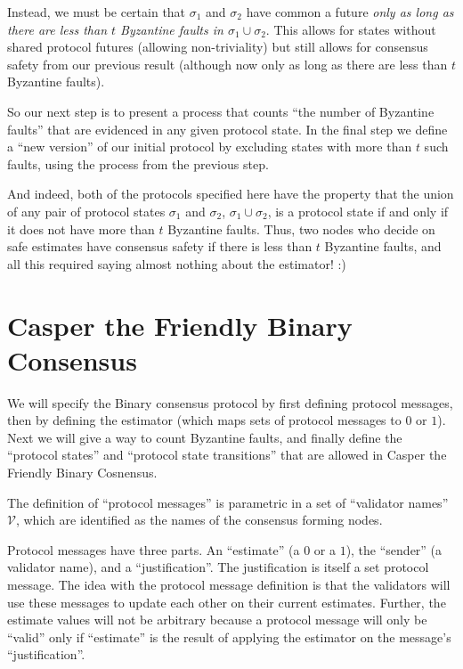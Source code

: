 \documentclass{article}
\theoremstyle{definition}
\begin{document}
Instead, we must be certain that $\sigma_1$ and $\sigma_2$ have common a future \emph{only as long as there are less than $t$ Byzantine faults in $\sigma_1 \cup \sigma_2$}. This allows for states without shared protocol futures (allowing non-triviality) but still allows for consensus safety from our previous result (although now only as long as there are less than $t$ Byzantine faults).

So our next step is to present a process that counts ``the number of Byzantine faults'' that are evidenced in any given protocol state. In the final step we define a ``new version'' of our initial protocol by excluding states with more than $t$ such faults, using the process from the previous step.

And indeed, both of the protocols specified here have the property that the union of any pair of protocol states $\sigma_1$ and $\sigma_2$, $\sigma_1 \cup \sigma_2$, is a protocol state if and only if it does not have more than $t$ Byzantine faults. Thus, two nodes who decide on safe estimates have consensus safety if there is less than $t$ Byzantine faults, and all this required saying almost nothing about the estimator! :)



\section{Casper the Friendly Binary Consensus}

We will specify the Binary consensus protocol by first defining protocol messages, then by defining the estimator (which maps sets of protocol messages to $0$ or $1$). Next we will give a way to count Byzantine faults, and finally define the ``protocol states'' and ``protocol state transitions'' that are allowed in Casper the Friendly Binary Cosnensus.

The definition of ``protocol messages'' is parametric in a set of ``validator names'' $\mathcal{V}$, which are identified as the names of the consensus forming nodes.

Protocol messages have three parts. An ``estimate'' (a $0$ or a $1$), the ``sender'' (a validator name), and a ``justification''. The justification is itself a set protocol message. The idea with the protocol message definition is that the validators will use these messages to update each other on their current estimates. Further, the estimate values will not be arbitrary because a protocol message will only be ``valid'' only if ``estimate'' is the result of applying the estimator on the message's ``justification''. 
\end{document}
